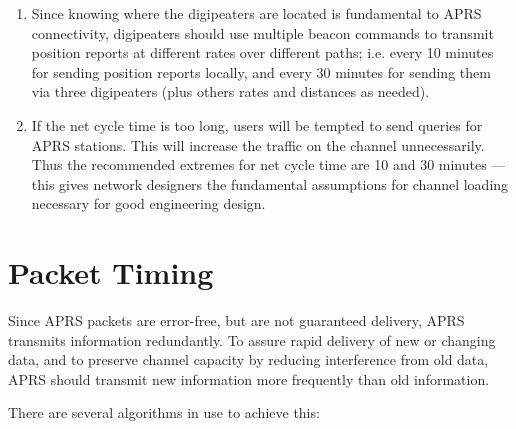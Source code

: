 \begin {enumerate}
\item Since knowing where the digipeaters are located is fundamental to APRS
connectivity, digipeaters should use multiple beacon commands to
transmit position reports at different rates over different paths; i.e. every
10 minutes for sending position reports locally, and every 30 minutes for
sending them via three digipeaters (plus others rates and distances as
needed).

\item If the net cycle time is too long, users will be tempted to send queries for
APRS stations. This will increase the traffic on the channel
unnecessarily. Thus the recommended extremes for net cycle time are 10
and 30 minutes — this gives network designers the fundamental
assumptions for channel loading necessary for good engineering design.

\end{enumerate}

\section {Packet Timing}

Since APRS packets are error-free, but are not guaranteed delivery, APRS
transmits information redundantly. To assure rapid delivery of new or
changing data, and to preserve channel capacity by reducing interference
from old data, APRS should transmit new information more frequently than
old information.

There are several algorithms in use to achieve this:

